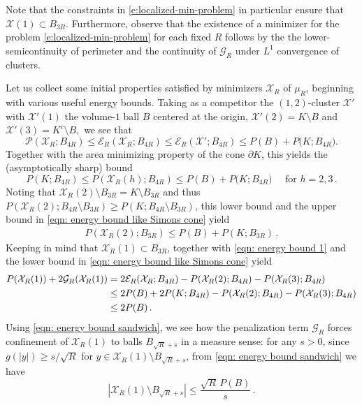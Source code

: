 \documentclass[10pt,reqno]{amsart}
\numberwithin{equation}{section}
\theoremstyle{definition}
\newcommand{\Ecal}{\mathcal{E}}
\newcommand{\Pcal}{\mathcal{P}}
\newcommand{\cG}{\mathcal{G}}
\newcommand{\X}{\mathcal{X}}
\begin{document}
Note that the constraints in \eqref{e:localized-min-problem} in particular ensure that $\X(1) \subset B_{3R}$. Furthermore, observe that the existence of a minimizer for the problem \eqref{e:localized-min-problem} for each fixed $R$ follows by the the lower-semicontinuity of perimeter and the continuity of $\cG_R$ under $L^1$ convergence of clusters.



Let us collect some initial properties satisfied by minimizers $\X_R$ of $\mu_R$, beginning with various useful energy bounds. Taking as a competitor the $(1,2)$-cluster $\X'$ with $\X'(1)$ the volume-$1$ ball $B$ centered at the origin, $\X'(2) = K \setminus B$ and $\X'(3) = K^c \setminus B,$ we see that
\begin{equation}
    \label{eqn: energy bound 1}
    \Pcal(\X_R ;B_{4R}) \leq \Ecal_R(\X_R; B_{4R}) \leq \Ecal_R(\X'; B_{4R}) \leq P(B) + {P\big(K; B_{4R}\big)}.
\end{equation}
Together with the area minimizing property of the cone $\partial K$, this yields the (asymptotically sharp) bound
\begin{equation}
    \label{eqn: energy bound like Simons cone}
   P(K; B_{4R}) \leq  P(\X_R(h) ; B_{4R} ) \leq P(B) + {P\big(K; B_{4R}\big)} \quad \text{ for } h=2,3\,.
\end{equation}
{Noting that $\X_R(2) \setminus B_{3R}=K \setminus B_{3R}$ and thus $P(\X_R(2);B_{4R} \setminus B_{3R} )\geq P(K;B_{4R} \setminus B_{3R})$, this lower bound and the upper bound in \eqref{eqn: energy bound like Simons cone} yield
\begin{align}\label{eq:good bound on 3R}
    P(\X_R(2);B_{3R})\leq P(B) + P(K;B_{3R})\,.
\end{align}
}
Keeping in mind that $\X_R(1) \subset B_{3R}$, together with \eqref{eqn: energy bound 1} and the lower bound in \eqref{eqn: energy bound like Simons cone} yield
\begin{align}
    \notag
P(\X_R(1))  + {2} \cG_R(\X_R(1))&=2\mathcal{E}_R (\X_R;B_{4R}) - P(\X_R(2);B_{4R}) - P(\X_R(3);B_{4R})  \\ \notag
&\leq 2P(B) + 2P(K;B_{4R})- P(\X_R(2);B_{4R}) - P(\X_R(3);B_{4R}) \\ \label{eqn: energy bound sandwich}
&\leq 2 P(B)\,.
\end{align}
Using \eqref{eqn: energy bound sandwich}, we see how the penalization term $\cG_R$ forces confinement of $\X_R(1)$ to balls $B_{{\sqrt{R}}+s}$ in a measure sense: 
%
for any $s>0$, since $g(|y|) \geq s/\sqrt{R}$ for $y \in \X_R(1) \setminus B_{{\sqrt{R}}+s}$, from \eqref{eqn: energy bound sandwich} we have
\begin{equation}\label{eqn: measure confinement}
   |\X_R(1) \setminus B_{{\sqrt{R}}+s}|  \leq \frac{ \sqrt{R}\, P(B)}{s}\,.  
\end{equation}
\end{document}
